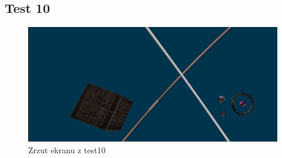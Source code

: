 \documentclass[11pt]{article}
\begin{document}
\subsection{Test 10}
\label{sec:org011e1f8}

\begin{figure}[htbp]
\centering
\includegraphics[width=.9\linewidth]{img/test10.png}
\caption{Zrzut ekranu z test10}
\end{figure}
\end{document}
